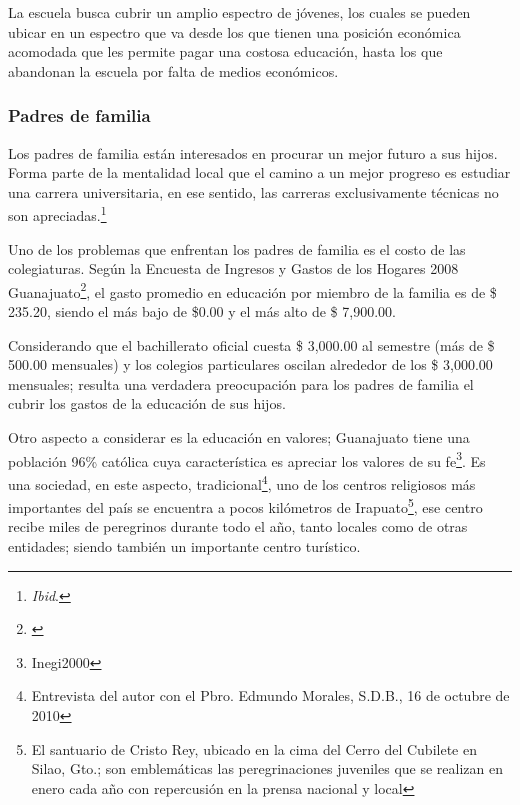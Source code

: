 La escuela busca cubrir un amplio espectro de jóvenes, los cuales se pueden ubicar en un espectro que va desde los que tienen una posición económica acomodada que les permite pagar una costosa educación, hasta los que abandonan la escuela por falta de medios económicos.

\subsubsection{Padres de familia}

Los padres de familia están interesados en procurar un mejor futuro a sus hijos. Forma parte de la mentalidad local que el camino a un mejor progreso es estudiar una carrera universitaria, en ese sentido, las carreras exclusivamente técnicas no son apreciadas.\footnote{\emph{Ibid}.}

Uno de los problemas que enfrentan los padres de familia es el costo de las colegiaturas. Según la Encuesta de Ingresos y Gastos de los Hogares 2008 Guanajuato\footnote{\citep{INEGI-2009-DGES-003}}, el gasto promedio en educaci\'on por miembro de la familia es de \$ 235.20, siendo el m\'as bajo de \$0.00 y el m\'as alto de \$ 7,900.00.

Considerando que el bachillerato oficial cuesta \$ 3,000.00 al semestre (m\'as de \$ 500.00 mensuales) y los colegios particulares oscilan alrededor de los \$ 3,000.00 mensuales; resulta una verdadera preocupaci\'on para los padres de familia el cubrir los gastos de la educaci\'on de sus hijos.

Otro aspecto a considerar es la educación en valores; Guanajuato tiene una población 96\% católica cuya característica es apreciar los valores de su fe\footnote{Inegi2000}. Es una sociedad, en este aspecto, tradicional\footnote{Entrevista del autor con el Pbro. Edmundo Morales, S.D.B., 16 de octubre de 2010}, uno de los centros religiosos más importantes del país se encuentra a pocos kilómetros de Irapuato\footnote{El santuario de Cristo Rey, ubicado en la cima del Cerro del Cubilete en Silao, Gto.; son emblemáticas las peregrinaciones juveniles que se realizan en enero cada año con repercusión en la prensa nacional y local}, ese centro recibe miles de peregrinos durante todo el año, tanto locales como de otras entidades; siendo también un importante centro turístico.

%

